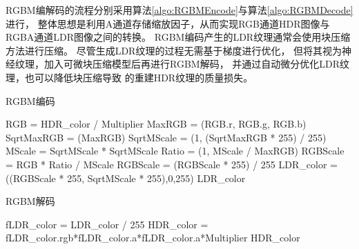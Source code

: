RGBM编解码的流程分别采用算法\ref{algo:RGBMEncode}与算法\ref{algo:RGBMDecode}进行，
整体思想是利用A通道存储缩放因子，从而实现RGB通道HDR图像与RGBA通道LDR图像之间的转换。
RGBM编码产生的LDR纹理通常会使用块压缩方法进行压缩。
尽管生成LDR纹理的过程无需基于梯度进行优化，
但将其视为神经纹理，加入可微块压缩模型后再进行RGBM解码，
并通过自动微分优化LDR纹理，也可以降低块压缩导致
的重建HDR纹理的质量损失。


\begin{algorithm}
    \caption{RGBM编码}
    \label{algo:RGBMEncode}
    {
        \Tfloat RGB = HDR\_color / Multiplier\;
        \float MaxRGB = \max(RGB.r, RGB.g, RGB.b)\;
        \float SqrtMaxRGB = \sqrt(MaxRGB)\;
        \float SqrtMScale = \min(1, \ceil(SqrtMaxRGB * 255) / 255)\;
        \float MScale = SqrtMScale * SqrtMScale\;
        \float Ratio = \min(1, MScale / MaxRGB)\;
        \Tfloat RGBScale = RGB * Ratio / MScale\;
        RGBScale = \round(RGBScale * 255) / 255\;
        \FInt LDR\_color = \clamp(\FInt(RGBScale * 255, SqrtMScale * 255),0,255)\;
        \Return LDR\_color\;
    }
\end{algorithm}
\begin{algorithm}
    \caption{RGBM解码}
    \label{algo:RGBMDecode}
    {
        \Ffloat fLDR\_color = LDR\_color / 255\;
        \Tfloat HDR\_color = fLDR\_color.rgb*fLDR\_color.a*fLDR\_color.a*Multiplier\;
        \Return HDR\_color\;
    }
\end{algorithm}


